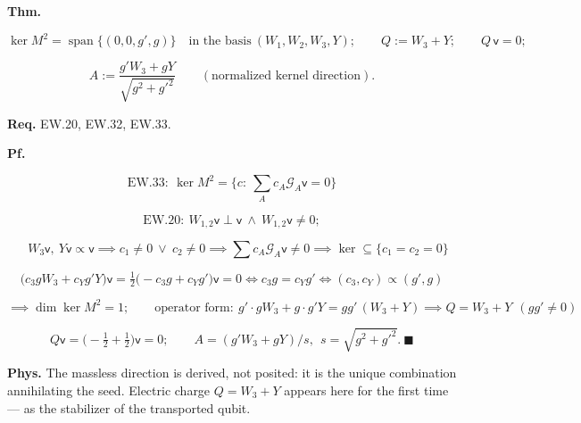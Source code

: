 \begin{theorem}\label{tag:EW-22}
\textbf{Thm.}

\[
\ker M^2=\operatorname{span}\{(0,0,g',g)\}\quad\text{in the basis}\ (W_1,W_2,W_3,Y);\qquad
Q:=W_3+Y;\qquad Q\,\mathsf v=0;
\]

\[
A:=\frac{g'W_3+gY}{\sqrt{g^2+g'^2}}\qquad(\text{normalized kernel direction}).
\]

\textbf{Req.} EW.20, EW.32, EW.33.

\textbf{Pf.}

\[
\mathrm{EW.33}:\ \ker M^2=\{c:\ \textstyle\sum_Ac_A\mathcal G_A\mathsf v=0\}
\]

\[
\mathrm{EW.20}:\ W_{1,2}\mathsf v\perp\mathsf v\ \wedge\ W_{1,2}\mathsf v\ne0;
\]

\[
\quad W_3\mathsf v,\ Y\mathsf v\propto\mathsf v\implies c_1\ne0\ \vee\ c_2\ne0\implies\textstyle\sum c_A\mathcal G_A\mathsf v\ne0\implies\ker\subseteq\{c_1=c_2=0\}
\]

\[
\bigl(c_3gW_3+c_Yg'Y\bigr)\mathsf v=\tfrac12\bigl(-c_3g+c_Yg'\bigr)\mathsf v=0\iff c_3g=c_Yg'\iff(c_3,c_Y)\propto(g',g)
\]

\[
\implies\dim\ker M^2=1;\qquad
\text{operator form}:\ g'\cdot gW_3+g\cdot g'Y=gg'\,(W_3+Y)\implies Q=W_3+Y\ \ (gg'\ne0)
\]

\[
Q\mathsf v=\bigl(-\tfrac12+\tfrac12\bigr)\mathsf v=0;\qquad A=(g'W_3+gY)/s,\ \ s=\sqrt{g^2+g'^2}.\ \blacksquare
\]

\textbf{Phys.} The massless direction is derived, not posited: it is the unique combination annihilating the seed. Electric charge $Q=W_3+Y$ appears here for the first time — as the stabilizer of the transported qubit.

\end{theorem}

